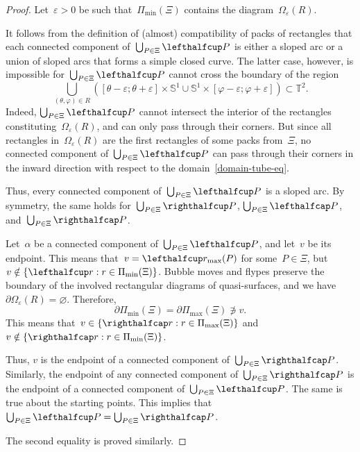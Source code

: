 \documentclass{amsart}
\def\cabl#1{\lefthalfcup#1}
\def\cabr#1{\righthalfcup#1}
\def\catl#1{\lefthalfcap#1}
\def\catr#1{\righthalfcap#1}
\theoremstyle{theorem}
\theoremstyle{remark}
\theoremstyle{definition}
\numberwithin{equation}{section}
\numberwithin{figure}{section}
\begin{document}
\begin{proof}
Let~$\varepsilon>0$ be such that~$\Pi_{\min}(\Xi)$ contains the diagram~$\Omega_\varepsilon(R)$.

It follows from the definition of (almost) compatibility of packs of rectangles that
each connected component of~$\bigcup_{P\in\Xi}\cabl P$ is either a sloped arc or a union of sloped arcs that forms a
simple closed curve. The latter case, however, is impossible for~$\bigcup_{P\in\Xi}\cabl P$
cannot cross the boundary of the region
\begin{equation}\label{domain-tube-eq}
\bigcup_{(\theta,\varphi)\in R}\left([\theta-\varepsilon;\theta+\varepsilon]\times\mathbb S^1\cup
\mathbb S^1\times[\varphi-\varepsilon;\varphi+\varepsilon]\right)\subset\mathbb T^2.
\end{equation}
Indeed, $\bigcup_{P\in\Xi}\cabl P$ cannot intersect the interior of the rectangles
constituting~$\Omega_\varepsilon(R)$, and can only pass through their corners.
But since all rectangles in~$\Omega_\varepsilon(R)$ are the first rectangles
of some packs from~$\Xi$, no connected component of~$\bigcup_{P\in\Xi}\cabl P$ can pass through their corners
in the inward direction with respect to the domain~\eqref{domain-tube-eq}.

Thus, every connected component of~$\bigcup_{P\in\Xi}\cabl P$
is a sloped arc. By symmetry, the same holds for~$\bigcup_{P\in\Xi}\cabr P$,
$\bigcup_{P\in\Xi}\catl P$, and~$\bigcup_{P\in\Xi}\catr P$.

Let~$\alpha$ be a connected component of~$\bigcup_{P\in\Xi}\cabl P$, and let~$v$
be its endpoint. This means that~$v=\cabl r_{\mathrm{max}}(P)$ for some~$P\in\Xi$,
but~$v\notin\{\cabl r:r\in\Pi_{\mathrm{min}}(\Xi)\}$. Bubble moves and flypes preserve
the boundary of the involved rectangular diagrams of quasi-surfaces, and we have~$\partial\Omega_\varepsilon(R)=\varnothing$. Therefore,
$$\partial\Pi_{\mathrm{min}}(\Xi)=\partial\Pi_{\mathrm{max}}(\Xi)\not\ni v.$$
This means that~$v\in\{\catr r:r\in\Pi_{\mathrm{max}}(\Xi)\}$
and~$v\notin\{\catr r:r\in\Pi_{\mathrm{min}}(\Xi)\}$.

Thus, $v$ is the endpoint of a connected component of~$\bigcup_{P\in\Xi}\catr P$.
Similarly, the endpoint of any connected component of~$\bigcup_{P\in\Xi}\catr P$
is the endpoint of a connected component of~$\bigcup_{P\in\Xi}\cabl P$.
The same is true about the starting points. This implies that~$\bigcup_{P\in\Xi}\cabl P=\bigcup_{P\in\Xi}\catr P$.

The second equality is proved similarly.
\end{proof}
\end{document}
